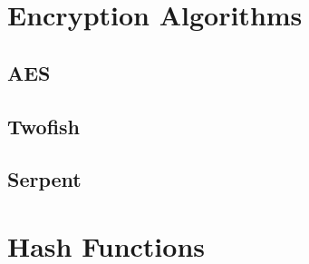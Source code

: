
\section{Encryption Algorithms}

\subsection{AES}
\label{sec:aes}

\subsection{Twofish}
\label{sec:twofish}

\subsection{Serpent}
\label{sec:serpent}

\section{Hash Functions}

